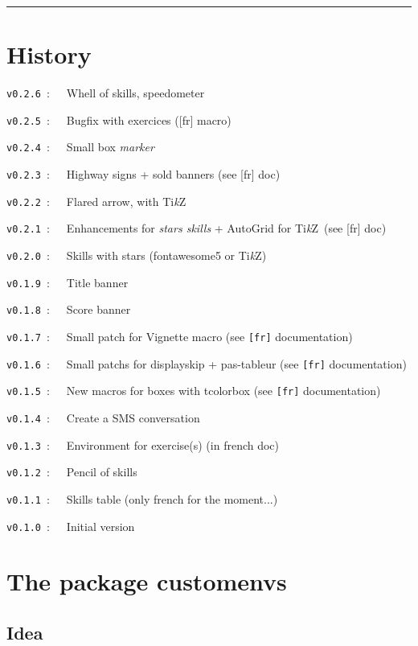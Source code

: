 \documentclass[english,11pt,a4paper]{article}
\providecommand\tikzlogo{Ti\textit{k}Z}
\let\TikZ\tikzlogo
\begin{document}
\hrule

\vfill

\section{History}

\verb|v0.2.6|~:~~~Whell of skills, speedometer

\verb|v0.2.5|~:~~~Bugfix with exercices (\textsf{[fr]} macro)

\verb|v0.2.4|~:~~~Small box \textit{marker}

\verb|v0.2.3|~:~~~Highway signs + sold banners (see \textsf{[fr]} doc)

\verb|v0.2.2|~:~~~Flared arrow, with \TikZ

\verb|v0.2.1|~:~~~Enhancements for \textit{stars skills} + AutoGrid for \TikZ\ (see \textsf{[fr]} doc)

\verb|v0.2.0|~:~~~Skills with stars (\textsf{fontawesome5} or \TikZ)

\verb|v0.1.9|~:~~~Title banner

\verb|v0.1.8|~:~~~Score banner

\verb|v0.1.7|~:~~~Small patch for \textsf{Vignette} macro (see \texttt{[fr]} documentation)

\verb|v0.1.6|~:~~~Small patchs for \textsf{displayskip} + \textsf{pas-tableur} (see \texttt{[fr]} documentation)

\verb|v0.1.5|~:~~~New macros for boxes with \textsf{tcolorbox} (see \texttt{[fr]} documentation)

\verb|v0.1.4|~:~~~Create a SMS conversation

\verb|v0.1.3|~:~~~Environment for exercise(s) (in french doc)

\verb|v0.1.2|~:~~~Pencil of skills

\verb|v0.1.1|~:~~~Skills table (only french for the moment...)

\verb|v0.1.0|~:~~~Initial version

\vspace*{5mm}

\pagebreak

\section{The package customenvs}

\subsection{Idea}
\end{document}
